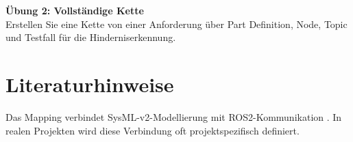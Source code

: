 \begin{uebungbox}
\textbf{Übung 2: Vollständige Kette}\\
Erstellen Sie eine Kette von einer Anforderung über Part Definition, Node, Topic und Testfall für die Hinderniserkennung.
\end{uebungbox}

\section{Literaturhinweise}
Das Mapping verbindet SysML-v2-Modellierung \cite{sysmlv2spec,sysmlv2pilot} mit ROS2-Kommunikation \cite{ros2docs}. In realen Projekten wird diese Verbindung oft projektspezifisch definiert.
